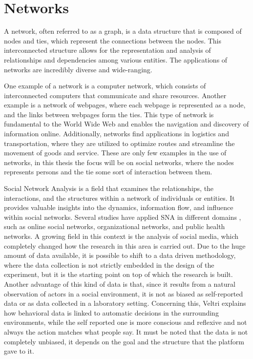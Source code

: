 \section[Networks]{Networks}

A network, often referred to as a graph, is a data structure that is composed of nodes and ties, which represent the connections between the nodes. This interconnected structure allows for the representation and analysis of relationships and dependencies among various entities. The applications of networks are incredibly diverse and wide-ranging.

One example of a network is a computer network, which consists of interconnected computers that communicate and share resources. Another example is a network of webpages, where each webpage is represented as a node, and the links between webpages form the ties. This type of network is fundamental to the World Wide Web and enables the navigation and discovery of information online. Additionally, networks find applications in logistics and transportation, where they are utilized to optimize routes and streamline the movement of goods and service. These are only few examples in the use of networks, in this thesis the focus will be on social networks, where the nodes represents persons and the tie some sort of interaction between them.


Social Network Analysis is a field that examines the relationships, the interactions, and the structures within a network of individuals or entities. It provides valuable insights into the dynamics, information flow, and influence within social networks. Several studies have
 applied SNA in different domains \cite{borgatti_network_2009}, such as online social networks, organizational networks, and public health networks. A growing field in this context is the analysis of social media, which completely changed how the research in this area is carried out. Due to the huge amount of data available, it is possible to shift to a data driven methodology, where the data collection is not strictly embedded in the design of the experiment, but it is the starting point on top of which the research is built. Another advantage of this kind of data is that, since it results from a natural observation of actors in a social environment, it is not as biased as self-reported data or as data collected in a laboratory setting. Concerning this, Veltri \cite{digital_veltri_2019} explains how behavioral data is linked to automatic decisions in the surrounding environments, while the self reported one is more conscious and reflexive and not always the action matches what people say. It must be noted that the data is not completely unbiased, it depends on the goal and the structure that the platform gave to it.

